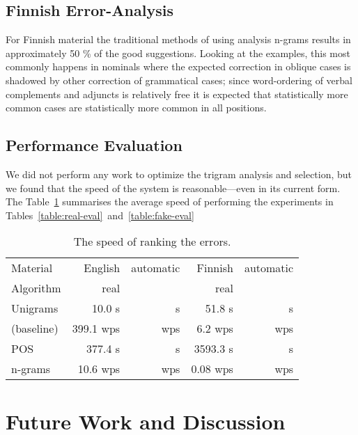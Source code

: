 \documentclass{llncs}
\begin{document}
\subsection{Finnish Error-Analysis}

For Finnish material the traditional methods of using analysis n-grams results
in approximately 50 \% of the good suggestions. Looking at the examples, this
most commonly happens in nominals where the expected correction in oblique
cases is shadowed by other correction of grammatical cases; since word-ordering
of verbal complements and adjuncts is relatively free it is expected that
statistically more common cases are statistically more common in all positions.

\subsection{Performance Evaluation}

We did not perform any work to optimize the trigram analysis and selection,
but we found that the speed of the system is reasonable---even in its current
form. The Table~\ref{table:speed-eval} summarises the average
speed of performing the experiments in Tables~\ref{table:real-eval}~and~\ref{table:fake-eval}

\begin{table}[h]
    \caption{The speed of ranking the errors.
    \label{table:speed-eval}}
  \begin{center}
    \begin{scriptsize}
      \begin{tabular}{lrrrr}
        \hline
        Material  & English & automatic & Finnish & automatic \\
        Algorithm & real    &           & real    &           \\
        \hline
        Unigrams   &    10.0 s &      s & 51.8 s &     s  \\
        (baseline) & 399.1 wps &    wps & 6.2 wps &   wps  \\
        \hline
        POS      &   377.4 s &     s & 3593.3 s &     s  \\
        n-grams  & 10.6  wps &   wps & 0.08 wps &   wps  \\
        \hline
      \end{tabular}
    \end{scriptsize}
  \end{center}
\end{table}


\section{Future Work and Discussion}
\label{sec:future-work}
\end{document}
